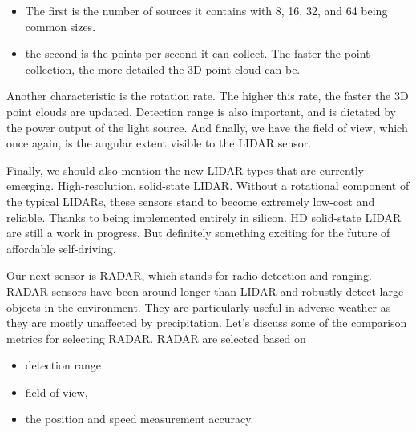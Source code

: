 \begin{itemize}

\item The first is the number of sources it contains with 8, 16, 32, and 64 being common sizes. 
\item the second is the points per second it can collect. The faster the point collection, the more
detailed the 3D point cloud can be. 
\end{itemize}

Another characteristic is the rotation rate. The higher this rate, the faster
the 3D point clouds are updated. Detection range is also important, and is dictated by the power
output of the light source. And finally, we have the field of view,
which once again, is the angular extent
visible to the LIDAR sensor. 

Finally, we should also mention the new
LIDAR types that are currently emerging. High-resolution, solid-state LIDAR. Without a rotational component
of the typical LIDARs, these sensors stand to become
extremely low-cost and reliable. Thanks to being implemented
entirely in silicon. HD solid-state LIDAR
are still a work in progress. But definitely something exciting for
the future of affordable self-driving. 


Our next sensor is RADAR, which stands for radio detection and ranging. RADAR sensors have been
around longer than LIDAR and robustly detect large
objects in the environment. They are particularly useful in adverse
weather as they are mostly unaffected by precipitation. Let's discuss some of the comparison
metrics for selecting RADAR. RADAR are selected based on

\begin{itemize}
\item detection range
\item field of view, 
\item the position and speed measurement accuracy. 
\end{itemize}

